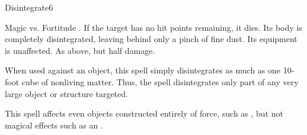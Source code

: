 \begin{spellsection}{Disintegrate}{6}
    \begin{spellheader}
    \end{spellheader}
    \begin{spellcontent}
        \begin{spelltargetinginfo}
        \end{spelltargetinginfo}
        \begin{spelleffects}
            \begin{spellattack}{Magic vs. Fortitude}
                \spellsuccess {}. If the target has no hit points remaining, it dies. Its body is completely disintegrated, leaving behind only a pinch of fine dust. Its equipment is unaffected.
                \spellfailure As above, but half damage.
            \end{spellattack}
            \spellspecial When used against an object, this spell simply disintegrates as much as one 10-foot cube of nonliving matter. Thus, the spell disintegrates only part of any very large object or structure targeted.
        \end{spelleffects}
    \end{spellcontent}
    \begin{spellfooter}
        \spellnotes This spell affects even objects constructed entirely of force, such as , but not magical effects such as an .
        \miscastrandom
    \end{spellfooter}
\end{spellsection}

